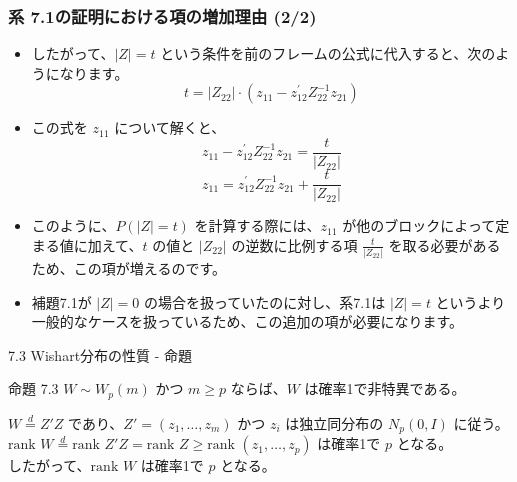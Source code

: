 \documentclass[aspectratio=169]{beamer}
\begin{document}
\begin{frame}
\frametitle{系 7.1の証明における項の増加理由 (2/2)}
\begin{itemize}
    \item したがって、$|Z|=t$ という条件を前のフレームの公式に代入すると、次のようになります。
    \[ t=|Z_{22}|\cdot(z_{11}-z_{12}^{\prime}Z_{22}^{-1}z_{21}) \]
    \item この式を $z_{11}$ について解くと、
    \[ z_{11}-z_{12}^{\prime}Z_{22}^{-1}z_{21}=\frac{t}{|Z_{22}|} \]
    \[ z_{11}=z_{12}^{\prime}Z_{22}^{-1}z_{21}+\frac{t}{|Z_{22}|} \]
    \item このように、$P(|Z|=t)$ を計算する際には、$z_{11}$ が他のブロックによって定まる値に加えて、$t$ の値と $|Z_{22}|$ の逆数に比例する項 $\frac{t}{|Z_{22}|}$ を取る必要があるため、この項が増えるのです。
    \item 補題7.1が $|Z|=0$ の場合を扱っていたのに対し、系7.1は $|Z|=t$ というより一般的なケースを扱っているため、この追加の項が必要になります。
\end{itemize}
\end{frame}

\begin{frame}{7.3 Wishart分布の性質 - 命題}
\begin{block}{命題 7.3}
$W \sim W_p(m)$ かつ $m \ge p$ ならば、$W$ は確率1で非特異である。
\end{block}

$W \overset{d}{=} Z'Z$ であり、$Z' = (z_1, \dots, z_m)$ かつ $z_i$ は独立同分布の $N_p(0, I)$ に従う。\\
$\text{rank } W \overset{d}{=} \text{rank } Z'Z = \text{rank } Z \ge \text{rank } (z_1, \dots, z_p)$ は確率1で $p$ となる。\\
したがって、$\text{rank } W$ は確率1で $p$ となる。
\end{frame}
\end{document}
